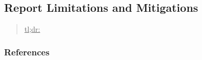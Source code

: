 



\subsection{Report Limitations and Mitigations}
\label{sec:report-limitations-and-mitigations}

\begin{quote}
\underline{tl;dr:} 
\end{quote}



\subsubsection{References}





